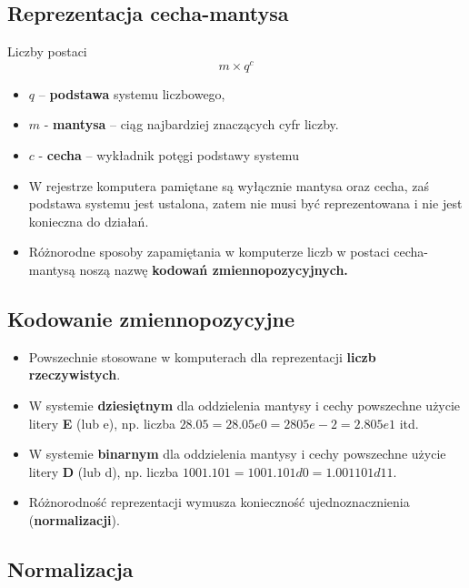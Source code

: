 \documentclass[main.tex]{subfiles}
\begin{document}
    \subsection{Reprezentacja cecha-mantysa}
    Liczby postaci
    \[ m \times q^c \]

    \begin{itemize}[noitemsep]
        \item $q$ -- \textbf{podstawa} systemu liczbowego,
        \item $m$ - \textbf{mantysa} -- ciąg najbardziej znaczących cyfr liczby.
        \item $c$ - \textbf{cecha} -- wykładnik potęgi podstawy systemu
        \item W rejestrze komputera pamiętane są wyłącznie mantysa oraz cecha, zaś podstawa systemu jest ustalona, zatem nie musi być reprezentowana i nie jest konieczna do działań.
        \item Różnorodne sposoby zapamiętania w komputerze liczb w postaci cecha-mantysą noszą nazwę \textbf{kodowań zmiennopozycyjnych.}

    \end{itemize}

    \subsection{Kodowanie zmiennopozycyjne}
    \begin{itemize}[noitemsep]
        \item Powszechnie stosowane w komputerach dla reprezentacji \textbf{liczb rzeczywistych}.
        \item W systemie \textbf{dziesiętnym} dla oddzielenia mantysy i cechy powszechne użycie litery \textbf{E} (lub e), np.
        liczba $28.05 = 28.05e0 = 2805e-2 = 2.805e1$ itd.

        \item W systemie \textbf{binarnym} dla oddzielenia mantysy i cechy powszechne użycie litery \textbf{D} (lub d), np.
        liczba $1001.101 = 1001.101d0 = 1.001101d11$.

        \item Różnorodność reprezentacji wymusza konieczność ujednoznacznienia (\textbf{normalizacji}).

    \end{itemize}

    \subsection{Normalizacja}
\end{document}
